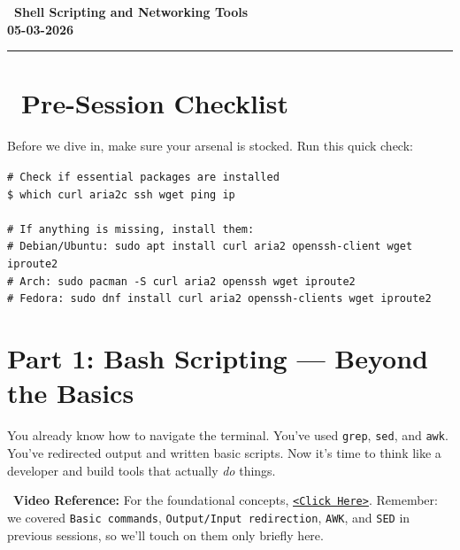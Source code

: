 \documentclass[12pt]{article}
\newcommand{\courseTitle}{Shell Scripting and Networking Tools}
\newcommand{\courseDate}{05-03-2026}
\newcommand{\scripticon}{\faCode}
\newcommand{\videoicon}{\faVideo}
\begin{document}
\begin{center}
\headingfont\Huge\bfseries\color{navy}
\scripticon\ \courseTitle\\[0.5em]
\Large\color{teamred}
\courseDate
\end{center}

\vspace{1em}
\begin{center}
\color{teamred}\rule{0.8\textwidth}{1pt}
\end{center}

\section*{\faCheckSquare\ Pre-Session Checklist}

Before we dive in, make sure your arsenal is stocked. Run this quick check:

\begin{highlightbox}
\texttt{\# Check if essential packages are installed}\\
\texttt{\$ which curl aria2c ssh wget ping ip}\\
\\
\texttt{\# If anything is missing, install them:}\\
\texttt{\# Debian/Ubuntu: sudo apt install curl aria2 openssh-client wget iproute2}\\
\texttt{\# Arch: sudo pacman -S curl aria2 openssh wget iproute2}\\
\texttt{\# Fedora: sudo dnf install curl aria2 openssh-clients wget iproute2}
\end{highlightbox}

\section*{Part 1: Bash Scripting — Beyond the Basics}

You already know how to navigate the terminal. You've used \texttt{grep}, \texttt{sed}, and \texttt{awk}. You've redirected output and written basic scripts. Now it's time to think like a developer and build tools that actually \textit{do} things.

\begin{infobox}
\videoicon\ \textbf{Video Reference:} For the foundational concepts, \href{https://youtu.be/tK9Oc6AEnR4?si=y3M0s1AIVfqtzCJB}{\texttt{<Click Here>}}. Remember: we covered \texttt{Basic commands}, \texttt{Output/Input redirection}, \texttt{AWK}, and \texttt{SED} in previous sessions, so we'll touch on them only briefly here.
\end{infobox}
\end{document}
